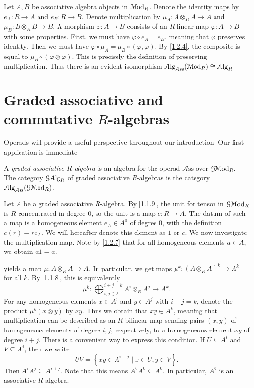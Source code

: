 \begin{discussion}\label{1.2.9}
	Let $A,B$ be associative algebra objects in $\mathcal{M}\mathrm{od} _R$. Denote the identity maps by $e_A : R \to A$ and $e_B : R \to B$. Denote multiplication by $\mu _A : A\otimes _RA \to A$ and $\mu _B : B\otimes _RB \to B$. A morphism $\varphi : A \to B$ consists of an $R$-linear map $\varphi : A \to B$ with some properties. First, we must have $\varphi \circ e_A = e_B$, meaning that $\varphi $ preserves identity. Then we must have $\varphi \circ \mu _A = \mu _B \circ (\varphi ,\varphi )$. By \cref{1.2.4}, the composite is equal to $\mu _B \circ (\varphi \otimes \varphi )$. This is precisely the definition of preserving multiplication. Thus there is an evident isomorphism $\mathcal{A}\mathrm{lg}_{\mathcal{A} \mathrm{ss} } (\mathcal{M}\mathrm{od} _R)\cong \mathcal{A}\mathrm{lg}_R$.
\end{discussion}

\section{Graded associative and commutative $R$-algebras}\label{sec:1.3}

Operads will provide a useful perspective throughout our introduction. Our first application is immediate.

\begin{definition}\label{1.3.1}
	A \emph{graded associative $R$-algebra} is an algebra for the operad $\mathcal{A} \mathrm{ss} $ over $\mathcal{G} \mathcal{M}\mathrm{od} _R$. The category $\mathcal{G} \mathcal{A}\mathrm{lg}_R$ of graded associative $R$-algebras is the category $\mathcal{A}\mathrm{lg}_{\mathcal{A} \mathrm{ss} } (\mathcal{G} \mathcal{M}\mathrm{od} _R)$.
\end{definition}

\begin{discussion}\label{1.3.2}
	Let $A$ be a graded associative $R$-algebra. By \cref{1.1.9}, the unit for tensor in $\mathcal{G} \mathcal{M}\mathrm{od} _R$ is $R$ concentrated in degree 0, so the unit is a map $e : R \to A$. The datum of such a map is a homogeneous element $e_A\in A^0$ of degree 0, with the definition $e(r)=re_A$. We will hereafter denote this element as $1$ or $e$. We now investigate the multiplication map. Note by \cref{1.2.7} that for all homogeneous elements $a\in A$, we obtain $a1=a$.

	 yields a map $\mu : A\otimes _RA \to A$. In particular, we get maps $\mu ^k : (A\otimes _RA)^k \to A^k$ for all $k$. By \cref{1.1.8}, this is equivalently
	\[
		\mu ^k : \bigoplus_{i,j\in\mathbb{Z} } ^{i+j=k} A^i \otimes _RA^j \to A^k
	.\]
	For any homogeneous elements $x\in A^i$ and $y\in A^j$ with $i+j=k$, denote the product $\mu ^k(x\otimes y)$ by $xy$. Thus we obtain that $xy\in A^k$, meaning that multiplication can be described as an $R$-bilinear map sending pairs $(x,y)$ of homogeneous elements of degree $i,j$, respectively, to a homogeneous element $xy$ of degree $i+j$. There is a convenient way to express this condition. If $U\subseteq A^i$ and $V\subseteq A^j$, then we write
	\[
		UV=\left\{ xy\in A^{i+j} \mid x\in U,y\in V \right\} .
	\]
	Then $A^iA^j \subseteq A^{i+j} $. Note that this means $A^0A^0 \subseteq A^0$. In particular, $A^0$ is an associative $R$-algebra.
\end{discussion}

